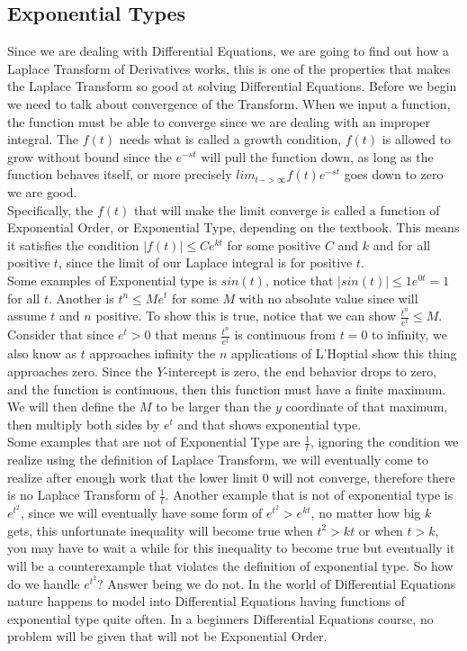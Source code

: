 \documentclass[12pt]{article}
\begin{document}
\subsection{Exponential Types}

Since we are dealing with Differential Equations, we are going to find out how a Laplace Transform of Derivatives works, this is one of the properties that makes the Laplace Transform so good at solving Differential Equations. Before we begin we need to talk about convergence of the Transform. When we input a function, the function must be able to converge since we are dealing with an improper integral. The $f(t)$ needs what is called a growth condition, $f(t)$ is allowed to grow without bound since the $e^{-st}$ will pull the function down, as long as the function behaves itself, or more precisely $lim_{t->\infty}f(t)e^{-st}$ goes down to zero we are good. \\

Specifically, the $f(t)$ that will make the limit converge is called a function of Exponential Order, or Exponential Type, depending on the textbook. This means it satisfies the condition $|f(t)| \leq Ce^{kt}$ for some positive $C$ and $k$ and for all positive $t$, since the limit of our Laplace integral is for positive $t$. \\

Some examples of Exponential type is $sin(t)$, notice that $|sin(t)| \leq 1e^{0t}=1$ for all $t$. Another is $t^n \leq Me^t$ for some $M$ with no absolute value since will assume $t$ and $n$ positive. To show this is true, notice that we can show $\frac{t^n}{e^t} \leq M$. Consider that since $e^t >0$ that means $\frac{t^n}{e^t}$ is continuous from $t=0$ to infinity, we also know as $t$ approaches infinity the $n$ applications of L'Hoptial show this thing approaches zero. Since the $Y$-intercept is zero, the end behavior drops to zero, and the function is continuous, then this function must have a finite maximum. We will then define the $M$ to be larger than the $y$ coordinate of that maximum, then multiply both sides by $e^t$ and that shows exponential type. \\

Some examples that are not of Exponential Type are $\frac{1}{t}$, ignoring the condition we realize using the definition of Laplace Transform, we will eventually come to realize after enough work that the lower limit $0$ will not converge, therefore there is no Laplace Transform of $\frac{1}{t}$. Another example that is not of exponential type is $e^{t^2}$, since we will eventually have some form of $e^{t^2}>e^{kt}$, no matter how big $k$ gets, this unfortunate inequality will become true when $t^2>kt$ or when $t>k$, you may have to wait a while for this inequality to become true but eventually it will be a counterexample that violates the definition of exponential type. So how do we handle $e^{t^2}$? Answer being we do not. In the world of Differential Equations nature happens to model into Differential Equations having functions of exponential type quite often. In a beginners Differential Equations course, no problem will be given that will not be Exponential Order.
\end{document}

